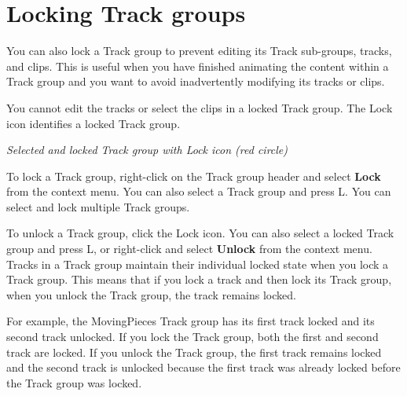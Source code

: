 \chapter{Locking Track groups}
\hypertarget{md__library_2_package_cache_2com_8unity_8timeline_0d1_87_86_2_documentation_0i_2grp__lock}{}\label{md__library_2_package_cache_2com_8unity_8timeline_0d1_87_86_2_documentation_0i_2grp__lock}
\label{md__library_2_package_cache_2com_8unity_8timeline_0d1_87_86_2_documentation_0i_2grp__lock_autotoc_md1143}%
%
 You can also lock a Track group to prevent editing its Track sub-\/groups, tracks, and clips. This is useful when you have finished animating the content within a Track group and you want to avoid inadvertently modifying its tracks or clips.

You cannot edit the tracks or select the clips in a locked Track group. The Lock icon identifies a locked Track group.



{\itshape Selected and locked Track group with Lock icon (red circle)}

To lock a Track group, right-\/click on the Track group header and select {\bfseries{Lock}} from the context menu. You can also select a Track group and press L. You can select and lock multiple Track groups.

To unlock a Track group, click the Lock icon. You can also select a locked Track group and press L, or right-\/click and select {\bfseries{Unlock}} from the context menu. Tracks in a Track group maintain their individual locked state when you lock a Track group. This means that if you lock a track and then lock its Track group, when you unlock the Track group, the track remains locked.

For example, the Moving\+Pieces Track group has its first track locked and its second track unlocked. If you lock the Track group, both the first and second track are locked. If you unlock the Track group, the first track remains locked and the second track is unlocked because the first track was already locked before the Track group was locked. 